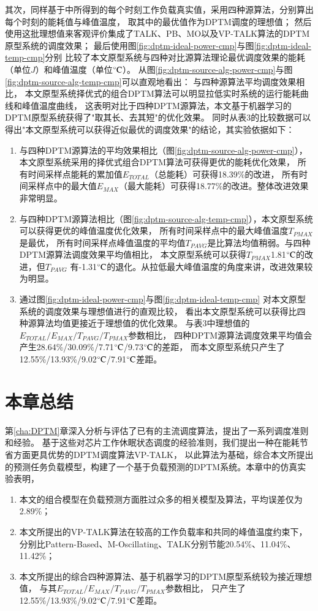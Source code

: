 其次，同样基于中所得到的每个时刻工作负载真实值，采用四种源算法，分别算出每个时刻的能耗值与峰值温度， 取其中的最优值作为DPTM调度的理想值； 然后使用这批理想值来客观评价集成了TALK、PB、MO以及VP-TALK算法的DPTM原型系统的调度效果； 最后使用图\ref{fig:dptm-ideal-power-cmp}与图\ref{fig:dptm-ideal-temp-cmp}分别 比较了本文原型系统与四种对比源算法理论最优调度效果的能耗（单位$J$）和峰值温度（单位$\celsius$）。
从图\ref{fig:dptm-source-alg-power-cmp}与图\ref{fig:dptm-source-alg-temp-cmp}可以直观地看出： 与四种源算法平均调度效果相比， 本文原型系统择优式的组合DPTM算法可以明显拉低实时系统的运行能耗曲线和峰值温度曲线， 这表明对比于四种DPTM源算法，本文基于机器学习的DPTM原型系统获得了"取其长、去其短"的优化效果。 同时从表3的比较数据可以得出"本文原型系统可以获得近似最优的调度效果"的结论，其实验依据如下：
\begin{enumerate}[1)]
\item 与四种DPTM源算法的平均效果相比（图\ref{fig:dptm-source-alg-power-cmp}）， 本文原型系统采用的择优式组合DPTM算法可获得更优的能耗优化效果， 所有时间采样点能耗的累加值$E_{TOTAL}$（总能耗）可获得18.39\%的改进， 所有时间采样点中的最大值$E_{MAX}$（最大能耗）可获得18.77\%的改进。整体改进效果非常明显。
\item 与四种DPTM源算法相比（图\ref{fig:dptm-source-alg-temp-cmp}），本文原型系统可以获得更优的峰值温度优化效果， 所有时间采样点中的最大峰值温度$T_{PMAX}$是最优， 所有时间采样点峰值温度的平均值$T_{PAVG}$是比算法均值稍弱。与四种DPTM源算法调度效果平均值相比， 本文原型系统可以获得$T_{PMAX}$1.81$\celsius$的改进，但$T_{PAVG}$ 有-1.31$\celsius$的退化。从拉低最大峰值温度的角度来讲，改进效果较为明显。
\item 通过图\ref{fig:dptm-ideal-power-cmp}与图\ref{fig:dptm-ideal-temp-cmp} 对本文原型系统的调度效果与理想值进行的直观比较， 看出本文原型系统可以获得比四种源算法均值更接近于理想值的优化效果。 与表3中理想值的$E_{TOTAL}/E_{MAX}/T_{PAVG}/T_{PMAX}$参数相比， 四种DPTM源算法调度效果平均值会产生28.64\%/30.09\%/7.71$\celsius$/9.73$\celsius$的差距， 而本文原型系统只产生了12.55\%/13.93\%/9.02$\celsius$/7.91$\celsius$差距。
\end{enumerate}

\section{本章总结}
第\ref{cha:DPTM}章深入分析与评估了已有的主流调度算法，提出了一系列调度准则和经验。 基于这些对芯片工作休眠状态调度的经验准则，我们提出一种在能耗节省方面更具优势的DPTM调度算法VP-TALK， 以此算法为基础，综合本文所提出的预测任务负载模型，构建了一个基于负载预测的DPTM系统。本章中的仿真实验表明，
\begin{enumerate}[1)]
\item 本文的组合模型在负载预测方面胜过众多的相关模型及算法，平均误差仅为2.89\%；
\item 本文所提出的VP-TALK算法在较高的工作负载率和共同的峰值温度约束下， 分别比Pattern-Based、M-Oscillating、TALK分别节能20.54\%、11.04\%、11.42\%；
\item 本文所提出的综合四种源算法、基于机器学习的DPTM原型系统较为接近理想值， 与其$E_{TOTAL}/E_{MAX}/T_{PAVG}/T_{PMAX}$参数相比， 只产生了12.55\%/13.93\%/9.02$\celsius$/7.91$\celsius$差距。
\end{enumerate}
